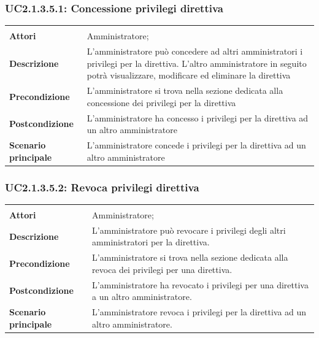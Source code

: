 \subsubsection{UC2.1.3.5.1: Concessione privilegi direttiva}
\label{UC2.1.3.5.1}
\begin{longtable}{l|p{10cm}}
\hline
&\\
\textbf{Attori} & Amministratore;\\[7pt]
\textbf{Descrizione} & L'amministratore può concedere ad altri amministratori i privilegi per la direttiva. L'altro amministratore in seguito potrà visualizzare, modificare ed eliminare la direttiva\\[7pt]
\textbf{Precondizione} & L'amministratore si trova nella sezione dedicata alla concessione dei privilegi per la direttiva\\[7pt]
\textbf{Postcondizione} & L'amministratore ha concesso i privilegi per la direttiva ad un altro amministratore\\[7pt]
\textbf{Scenario principale} & L'amministratore concede i privilegi per la direttiva ad un altro amministratore\\[7pt]\hline
\end{longtable}

\subsubsection{UC2.1.3.5.2: Revoca privilegi direttiva}
\label{UC2.1.3.5.2}
\begin{longtable}{l|p{10cm}}
\hline
&\\
\textbf{Attori} & Amministratore;\\[7pt]
\textbf{Descrizione} & L'amministratore può revocare i privilegi degli altri amministratori per la direttiva.\\[7pt]
\textbf{Precondizione} & L'amministratore si trova nella sezione dedicata alla revoca dei privilegi per una direttiva.\\[7pt]
\textbf{Postcondizione} & L'amministratore ha revocato i privilegi per una direttiva a un altro amministratore.\\[7pt]
\textbf{Scenario principale} & L'amministratore revoca i privilegi per la direttiva ad un altro amministratore.\\[7pt]\hline
\end{longtable}

